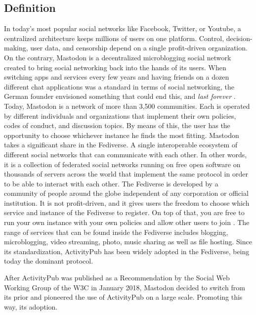 \subsection{Definition}
In today's most popular social networks like Facebook, Twitter, or Youtube, a centralized architecture keeps millions of users on one platform. Control, decision-making, user data, and censorship depend on a single profit-driven organization. On the contrary, Mastodon is a decentralized microblogging social network created to bring social networking back into the hands of its users. When switching apps and services every few years and having friends on a dozen different chat applications was a standard in terms of social networking, the German founder envisioned something that could end this, and \emph{last forever} \cite{tilley_2018}. Today, Mastodon is a network of more than 3,500 communities. Each is operated by different individuals and organizations that implement their own policies, codes of conduct, and discussion topics. By means of this,  the user has the opportunity to choose whichever instance he finds the most fitting.
Mastodon takes a significant share in the Fediverse. A single interoperable ecosystem of different social networks that can communicate with each other. In other words, it is a collection of federated social networks running on free open software on thousands of servers across the world that implement the same protocol in order to be able to interact with each other. The Fediverse is developed by a community of people around the globe independent of any corporation or official institution. It is not profit-driven, and it gives users the freedom to choose which service and instance of the Fediverse to register. On top of that, you are free to run your own instance with your own policies and allow other users to join \cite{holloway_2018}. The range of services that can be found inside the Fediverse includes blogging, microblogging, video streaming, photo, music sharing as well as file hosting. Since its standardization, ActivityPub has been widely adopted in the Fediverse, being today the dominant protocol.

After ActivityPub was published as a Recommendation by the Social Web Working Group of the W3C in January 2018, Mastodon decided to switch from its prior and pioneered the use of ActivityPub on a large scale. Promoting this way, its adoption.

